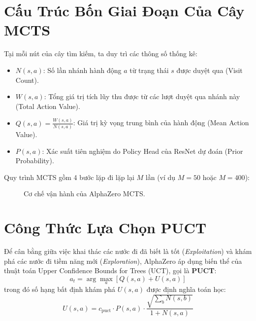 \documentclass[12pt,a4paper,oneside]{report}
\begin{document}
\section{Cấu Trúc Bốn Giai Đoạn Của Cây MCTS}

Tại mỗi nút của cây tìm kiếm, ta duy trì các thông số thống kê:
\begin{itemize}
    \item $N(s, a)$: Số lần nhánh hành động $a$ từ trạng thái $s$ được duyệt qua (Visit Count).
    \item $W(s, a)$: Tổng giá trị tích lũy thu được từ các lượt duyệt qua nhánh này (Total Action Value).
    \item $Q(s, a) = \frac{W(s, a)}{N(s, a)}$: Giá trị kỳ vọng trung bình của hành động (Mean Action Value).
    \item $P(s, a)$: Xác suất tiên nghiệm do Policy Head của ResNet dự đoán (Prior Probability).
\end{itemize}

Quy trình MCTS gồm 4 bước lặp đi lặp lại $M$ lần (ví dụ $M = 50$ hoặc $M = 400$):

\begin{figure}[htbp]
\centering
{}
\caption{Cơ chế vận hành của AlphaZero MCTS.}
\end{figure}

\section{Công Thức Lựa Chọn PUCT}

Để cân bằng giữa việc khai thác các nước đi đã biết là tốt (\textit{Exploitation}) và khám phá các nước đi tiềm năng mới (\textit{Exploration}), AlphaZero áp dụng biến thể của thuật toán Upper Confidence Bounds for Trees (UCT), gọi là \textbf{PUCT}:
\begin{equation}
    a_t = \arg\max_{a} \left[ Q(s, a) + U(s, a) \right]
\end{equation}
trong đó số hạng bất định khám phá $U(s, a)$ được định nghĩa toán học:
\begin{equation}
    U(s, a) = c_{\text{puct}} \cdot P(s, a) \cdot \frac{\sqrt{\sum_b N(s, b)}}{1 + N(s, a)}
\end{equation}
\end{document}
